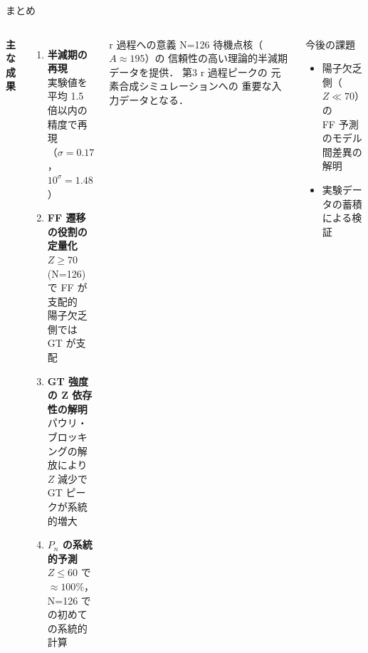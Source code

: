 \documentclass[aspectratio=169,12pt]{beamer}
\begin{document}
\begin{frame}{まとめ}
  \begin{columns}
    \textbf{主な成果}
    \begin{enumerate}
      \item \textbf{半減期の再現}\\
            実験値を平均 1.5 倍以内の精度で再現\\
            （$\sigma = 0.17$，$10^\sigma = 1.48$）
      \item \textbf{FF 遷移の役割の定量化}\\
            $Z \geq 70$ (N=126) で FF が支配的\\
            陽子欠乏側では GT が支配
      \item \textbf{GT 強度の Z 依存性の解明}\\
            パウリ・ブロッキングの解放により\\
            $Z$ 減少で GT ピークが系統的増大
      \item \textbf{$P_n$ の系統的予測}\\
            $Z \leq 60$ で $\approx 100\%$，\\
            N=126 での初めての系統的計算
    \end{enumerate}

    \begin{alertblock}{r 過程への意義}
      N=126 待機点核（$A \approx 195$）の
      信頼性の高い理論的半減期データを提供．
      第3 r 過程ピークの
      元素合成シミュレーションへの
      重要な入力データとなる．
    \end{alertblock}

    \vspace{0.5em}
    \begin{block}{今後の課題}
      \begin{itemize}
        \item 陽子欠乏側（$Z \ll 70$）の\\
              FF 予測のモデル間差異の解明
        \item 実験データの蓄積による検証
      \end{itemize}
    \end{block}
  \end{columns}
\end{frame}
\end{document}
